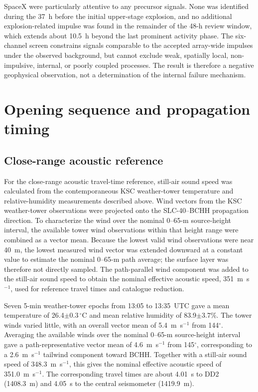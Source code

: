 \documentclass[]{seismica}
\begin{document}
SpaceX were particularly attentive to any precursor signals. None was
identified during the 37~h before the initial upper-stage explosion, and no
additional explosion-related impulse was found in the remainder of the 48-h
review window, which extends about 10.5~h beyond the last prominent activity
phase. The six-channel screen constrains signals comparable to the accepted
array-wide impulses under the observed background, but cannot exclude weak,
spatially local, non-impulsive, internal, or poorly coupled processes. The
result is therefore a negative geophysical observation, not a determination
of the internal failure mechanism.


\section{Opening sequence and propagation timing}
\label{sec:opening_timing}

\subsection{Close-range acoustic reference}

For the close-range acoustic travel-time reference, still-air sound speed was
calculated from the contemporaneous KSC weather-tower temperature and
relative-humidity measurements described above. Wind vectors from the KSC 
weather-tower observations were projected onto the SLC-40--BCHH propagation 
direction. To characterize the wind
over the nominal 0--65-m source-height interval, the available tower wind
observations within that height range were combined as a vector mean. Because
the lowest valid wind observations were near 40~m, the lowest measured wind
vector was extended downward at a constant value to estimate the nominal
0--65-m path average; the surface layer was therefore not directly sampled.
The path-parallel wind component was added to the still-air sound speed to
obtain the nominal effective acoustic speed, 351~m~s$^{-1}$, used for
reference travel times and catalogue reduction.

Seven 5-min weather-tower epochs from 13:05 to 13:35~UTC gave a mean
temperature of 26.4$\pm0.3\,^{\circ}$C and mean relative humidity of
83.9$\pm3.7\%$. The tower winds varied little, with an overall vector mean of
5.4~m~s$^{-1}$ from 144$^\circ$. Averaging the available winds over the
nominal 0--65-m source-height interval gave a path-representative vector mean
of 4.6~m~s$^{-1}$ from 145$^\circ$, corresponding to a 2.6~m~s$^{-1}$
tailwind component toward BCHH. Together with a still-air sound speed of
348.3~m~s$^{-1}$, this gives the nominal effective acoustic speed of
351.0~m~s$^{-1}$. The corresponding travel times are about 4.01~s to DD2
(1408.3~m) and 4.05~s to the central seismometer (1419.9~m).
\end{document}
